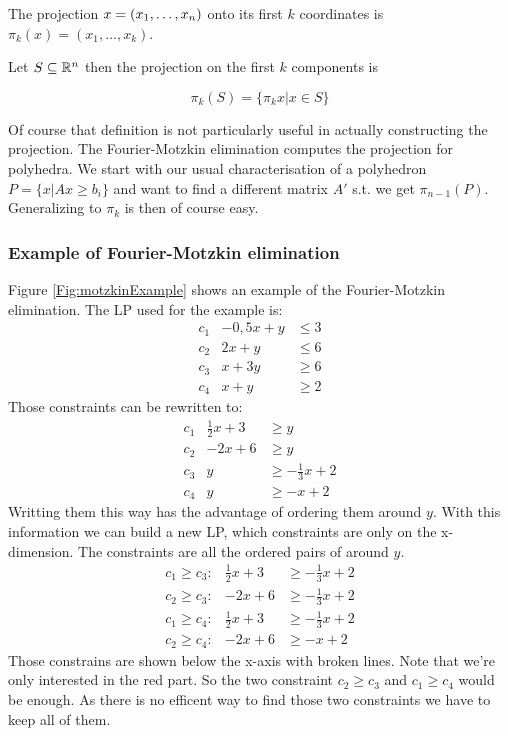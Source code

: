 \begin{Def} The projection $x=({x}_1,\ldots,{x}_{n})$ onto its first $k$ coordinates is $\pi_k(x) = (x_1,\ldots, x_k)$. 

Let $S\subseteq \mathbb{R}^n$ then the projection on the first $k$ components is

\[\pi_k(S)=\{\pi_k{x}|x\in S\}\]
\end{Def}

Of course that definition is not particularly useful in actually constructing the projection. The Fourier-Motzkin elimination computes the projection for polyhedra. We start with our usual characterisation of a polyhedron $P=\{x|Ax\geq b_i\}$ and want to find a different matrix $A'$ s.t. we get $\pi_{n-1}(P)$. Generalizing to $\pi_k$ is then of course easy.

\subsubsection*{Example of Fourier-Motzkin elimination}
Figure \ref{Fig:motzkinExample} shows an example of the Fourier-Motzkin elimination. The LP used for the example is:
\begin{eqnarray*}
c_1 & -0,5x + y & \leq 3 \\
c_2 & 2x + y & \leq 6 \\
c_3 & x+3y & \geq 6 \\
c_4 & x+y & \geq 2
\end{eqnarray*}
Those constraints can be rewritten to:
\begin{eqnarray*}
c_1 & \frac{1}{2}x + 3  & \geq y \\
c_2 & -2x+6 & \geq y \\
c_3 & y & \geq -\frac{1}{3}x+2 \\
c_4 & y & \geq -x+2
\end{eqnarray*}
Writting them this way has the advantage of ordering them around $y$. With this information we can build a new LP, which constraints are only on the x-dimension. The constraints are all the ordered pairs of around $y$.
\begin{eqnarray*}
c_1 \geq c_3: & \frac{1}{2}x + 3 & \geq -\frac{1}{3}x+2  \\
c_2 \geq c_3: & -2x+6 &  \geq -\frac{1}{3}x+2 \\
c_1 \geq c_4: & \frac{1}{2}x + 3   & \geq -\frac{1}{3}x+2 \\
c_2 \geq c_4: & -2x+6 & \geq -x+2
\end{eqnarray*}
Those constrains are shown below the x-axis with broken lines. Note that we're only interested in the red part. So the two constraint $c_2 \geq c_3$ and $c_1 \geq c_4$ would be enough. As there is no efficent way to find those two constraints we have to keep all of them. 

